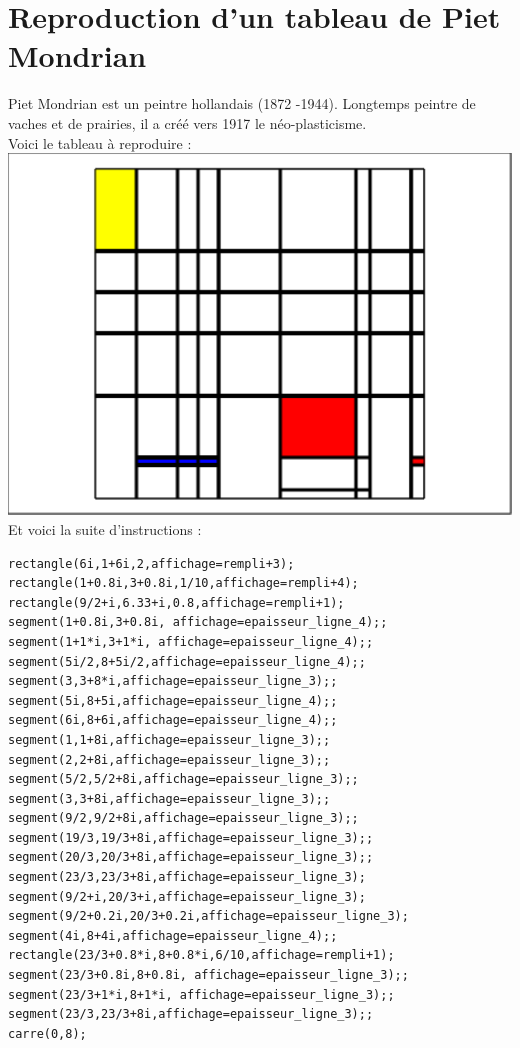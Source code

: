 \documentclass[a4paper,11pt]{book}
\begin{document}
\section{Reproduction d'un tableau de Piet Mondrian}
Piet Mondrian est un peintre hollandais (1872 -1944). Longtemps peintre de 
vaches et de prairies, il a cr\'e\'e vers 1917 le n\'eo-plasticisme.\\ 
Voici le tableau \`a reproduire :\\
\includegraphics[width=\textwidth]{mondrian1}\\
Et voici la suite d'instructions :
\begin{verbatim}
rectangle(6i,1+6i,2,affichage=rempli+3);
rectangle(1+0.8i,3+0.8i,1/10,affichage=rempli+4);
rectangle(9/2+i,6.33+i,0.8,affichage=rempli+1);
segment(1+0.8i,3+0.8i, affichage=epaisseur_ligne_4);;
segment(1+1*i,3+1*i, affichage=epaisseur_ligne_4);;
segment(5i/2,8+5i/2,affichage=epaisseur_ligne_4);;
segment(3,3+8*i,affichage=epaisseur_ligne_3);;
segment(5i,8+5i,affichage=epaisseur_ligne_4);;
segment(6i,8+6i,affichage=epaisseur_ligne_4);;
segment(1,1+8i,affichage=epaisseur_ligne_3);;
segment(2,2+8i,affichage=epaisseur_ligne_3);;
segment(5/2,5/2+8i,affichage=epaisseur_ligne_3);;
segment(3,3+8i,affichage=epaisseur_ligne_3);;
segment(9/2,9/2+8i,affichage=epaisseur_ligne_3);;
segment(19/3,19/3+8i,affichage=epaisseur_ligne_3);;
segment(20/3,20/3+8i,affichage=epaisseur_ligne_3);;
segment(23/3,23/3+8i,affichage=epaisseur_ligne_3);
segment(9/2+i,20/3+i,affichage=epaisseur_ligne_3);
segment(9/2+0.2i,20/3+0.2i,affichage=epaisseur_ligne_3);
segment(4i,8+4i,affichage=epaisseur_ligne_4);;
rectangle(23/3+0.8*i,8+0.8*i,6/10,affichage=rempli+1);
segment(23/3+0.8i,8+0.8i, affichage=epaisseur_ligne_3);;
segment(23/3+1*i,8+1*i, affichage=epaisseur_ligne_3);;
segment(23/3,23/3+8i,affichage=epaisseur_ligne_3);;
carre(0,8);
\end{verbatim}
\end{document}
